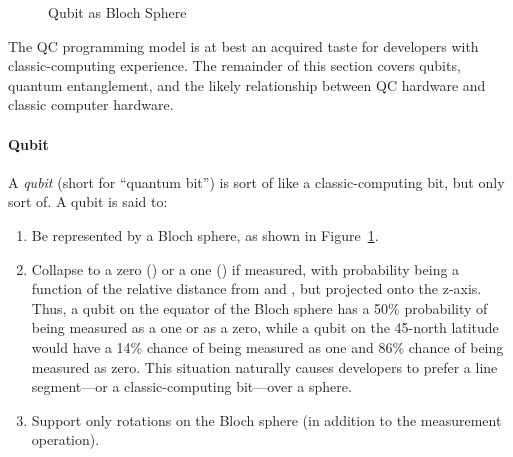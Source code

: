 \begin{figure}[tb]
\centering
{}
\caption{Qubit as Bloch Sphere}
\label{fig:future:Qubit as Bloch Sphere}
\end{figure}

The QC programming model is at best an acquired taste for developers
with classic-computing experience.
The remainder of this section covers qubits,
quantum entanglement,
and
the likely relationship between QC hardware and classic computer hardware.

\paragraph{Qubit}

A \emph{qubit} (short for ``quantum bit'') is sort of like a
classic-computing bit, but only sort of.
A qubit is said to:

\begin{enumerate}
\item	Be represented by a Bloch sphere, as shown in
	Figure~\ref{fig:future:Qubit as Bloch Sphere}.
\item	Collapse to a zero () or a one () if measured,
	with probability being a function of the relative distance from
	 and , but projected onto the z-axis.
	Thus, a qubit on the equator of the Bloch sphere has a 50\%
	probability of being measured as a one or as a zero, while
	a qubit on the 45\textdegree-north latitude would have
	a 14\% chance of being measured as one and 86\% chance
	of being measured as zero.
	This situation naturally causes developers to prefer a line
	segment---or a classic-computing bit---over a sphere.
\item	Support only rotations on the Bloch sphere (in addition to
	the measurement operation).
\end{enumerate}

